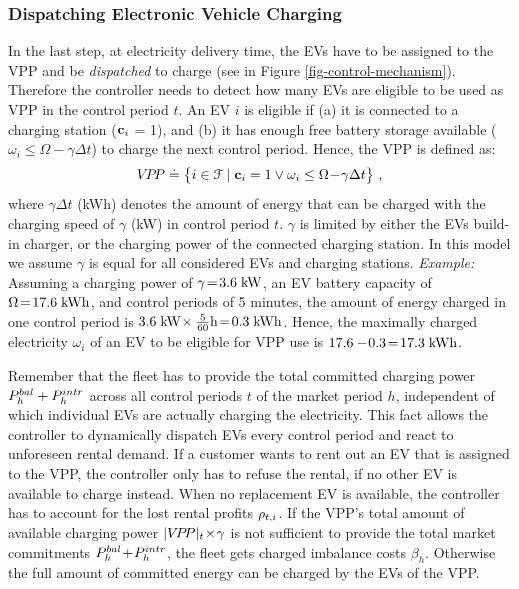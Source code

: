 \documentclass[a4paper, 12pt]{article}
\begin{document}
\subsubsection{Dispatching Electronic Vehicle Charging}
\label{sec:org930285a}
In the last step, at electricity delivery time, the EVs have to be assigned to
the VPP and be \emph{dispatched} to charge (see in Figure
\ref{fig-control-mechanism}). Therefore the controller needs to detect how many
EVs are eligible to be used as VPP in the control period \(t\). An EV \(i\) is
eligible if (a) it is connected to a charging station (\({\bf{c}}_{i}\) = 1), and (b) it has
enough free battery storage available
(\(\omega_{i}\leq\Omega\!-\!\gamma\Delta{t}\)) to charge the next control
period. Hence, the VPP is defined as:
\begin{equation}
    V\!P\!P \doteq \big\{i\in{\cal{F}} \;|\; {\bf{c}}_{i} = 1 \vee \omega_{i}\leq\Omega\!-\!\gamma\Delta{t}\big\} \text{ ,}
\end{equation}
where \(\gamma\Delta{t}\) (kWh) denotes the amount of energy that can be charged
with the charging speed of \(\gamma\) (kW) in control period \(t\). \(\gamma\) is
limited by either the EVs build-in charger, or the charging power of the
connected charging station. In this model we assume \(\gamma\) is equal for all
considered EVs and charging stations. \emph{Example:} Assuming a charging power of
\(\gamma\!=\!3.6\;\text{kW}\), an EV battery capacity of \(\Omega\!=\!17.6\;\text{kWh}\), and
control periods of 5 minutes, the amount of energy charged in one control period
is \(3.6\;\text{kW}\!\times\frac{5}{60}\text{h}\!=\!0.3\;\text{kWh}\). Hence, the maximally
charged electricity \(\omega_{i}\) of an EV to be eligible for VPP use is
\(17.6-\!0.3\!=\!17.3\;\text{kWh}\).

Remember that the fleet has to provide the total committed charging power
\(P^{bal}_{h}+P^{intr}_{h}\) across all control periods \(t\) of the market period \(h\),
independent of which individual EVs are actually charging the electricity. This
fact allows the controller to dynamically dispatch EVs every control period and
react to unforeseen rental demand. If a customer wants to rent out an EV that is
assigned to the VPP, the controller only has to refuse the rental, if no other
EV is available to charge instead. When no replacement EV is available, the
controller has to account for the lost rental profits \(\rho_{t,i}\). If the VPP's total
amount of available charging power \(|{V\!P\!P}|_{t}\!\times\!\gamma\) is not sufficient
to provide the total market commitments \(P^{bal}_{h}\!+\!P^{intr}_{h}\), the fleet gets
charged imbalance costs \(\beta_{h}\). Otherwise the full amount of committed
energy can be charged by the EVs of the VPP.
\end{document}
